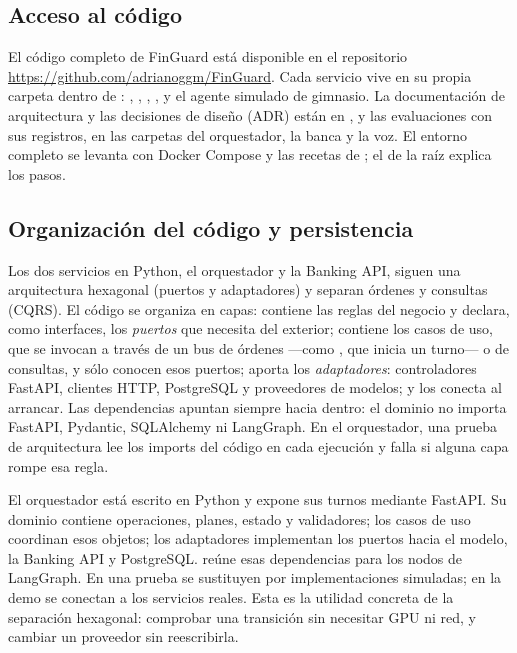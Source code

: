 \documentclass[12pt,a4paper]{article}
\begin{document}
\subsection{Acceso al código}
\label{sec:code}
El código completo de FinGuard está disponible en el repositorio \url{https://github.com/adrianoggm/FinGuard}. Cada servicio vive en su propia carpeta dentro de : , , , ,  y el agente simulado de gimnasio. La documentación de arquitectura y las decisiones de diseño (ADR) están en , y las evaluaciones con sus registros, en las carpetas  del orquestador, la banca y la voz. El entorno completo se levanta con Docker Compose y las recetas de ; el  de la raíz explica los pasos.

\subsection{Organización del código y persistencia}
Los dos servicios en Python, el orquestador y la Banking API, siguen una arquitectura hexagonal (puertos y adaptadores) y separan órdenes y consultas (CQRS). El código se organiza en capas:  contiene las reglas del negocio y declara, como interfaces, los \emph{puertos} que necesita del exterior;  contiene los casos de uso, que se invocan a través de un bus de órdenes ---como , que inicia un turno--- o de consultas, y sólo conocen esos puertos;  aporta los \emph{adaptadores}: controladores FastAPI, clientes HTTP, PostgreSQL y proveedores de modelos; y  los conecta al arrancar. Las dependencias apuntan siempre hacia dentro: el dominio no importa FastAPI, Pydantic, SQLAlchemy ni LangGraph. En el orquestador, una prueba de arquitectura lee los imports del código en cada ejecución y falla si alguna capa rompe esa regla.

El orquestador está escrito en Python y expone sus turnos mediante FastAPI. Su dominio contiene operaciones, planes, estado y validadores; los casos de uso coordinan esos objetos; los adaptadores implementan los puertos hacia el modelo, la Banking API y PostgreSQL.  reúne esas dependencias para los nodos de LangGraph. En una prueba se sustituyen por implementaciones simuladas; en la demo se conectan a los servicios reales. Esta es la utilidad concreta de la separación hexagonal: comprobar una transición sin necesitar GPU ni red, y cambiar un proveedor sin reescribirla.
\end{document}
